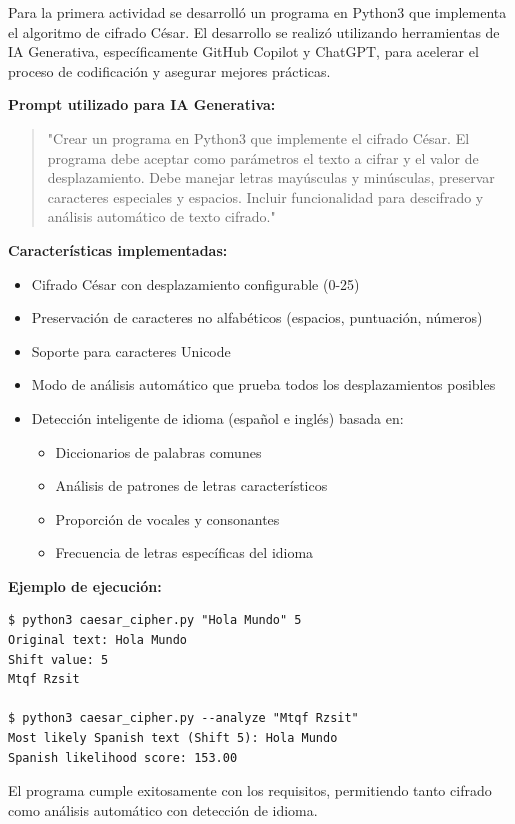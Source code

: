 \documentclass[letter,12pt]{article}
\begin{document}
Para la primera actividad se desarrolló un programa en Python3 que implementa el algoritmo de cifrado César. El desarrollo se realizó utilizando herramientas de IA Generativa, específicamente GitHub Copilot y ChatGPT, para acelerar el proceso de codificación y asegurar mejores prácticas.

\textbf{Prompt utilizado para IA Generativa:}
\begin{quote}
"Crear un programa en Python3 que implemente el cifrado César. El programa debe aceptar como parámetros el texto a cifrar y el valor de desplazamiento. Debe manejar letras mayúsculas y minúsculas, preservar caracteres especiales y espacios. Incluir funcionalidad para descifrado y análisis automático de texto cifrado."
\end{quote}

\textbf{Características implementadas:}
\begin{itemize}
    \item Cifrado César con desplazamiento configurable (0-25)
    \item Preservación de caracteres no alfabéticos (espacios, puntuación, números)
    \item Soporte para caracteres Unicode
    \item Modo de análisis automático que prueba todos los desplazamientos posibles
    \item Detección inteligente de idioma (español e inglés) basada en:
    \begin{itemize}
        \item Diccionarios de palabras comunes
        \item Análisis de patrones de letras característicos
        \item Proporción de vocales y consonantes
        \item Frecuencia de letras específicas del idioma
    \end{itemize}
\end{itemize}

\textbf{Ejemplo de ejecución:}
\begin{verbatim}
$ python3 caesar_cipher.py "Hola Mundo" 5
Original text: Hola Mundo
Shift value: 5
Mtqf Rzsit

$ python3 caesar_cipher.py --analyze "Mtqf Rzsit"
Most likely Spanish text (Shift 5): Hola Mundo
Spanish likelihood score: 153.00
\end{verbatim}

El programa cumple exitosamente con los requisitos, permitiendo tanto cifrado como análisis automático con detección de idioma.
\end{document}

